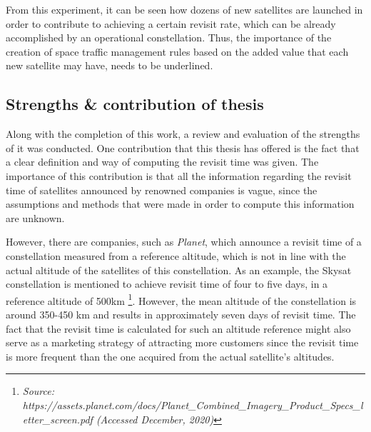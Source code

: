 From this experiment, it can be seen how dozens of new satellites are launched in order to contribute to achieving a certain revisit rate, which can be already accomplished by an operational constellation. Thus, the importance of the creation of space traffic management rules based on the added value that each new satellite may have, needs to be underlined.


%


\bigskip
\subsection{Strengths \& contribution of thesis}
\bigskip

Along with the completion of this work, a review and evaluation of the strengths of it was conducted. One contribution that this thesis has offered is the fact that a clear definition and way of computing the revisit time was given. The importance of this contribution is that all the information regarding the revisit time of satellites announced by renowned companies is vague, since the assumptions and methods that were made in order to compute this information are unknown.

However, there are companies, such as \textit{Planet}, which announce a revisit time of a constellation measured from a reference altitude, which is not in line with the actual altitude of the satellites of this constellation. As an example, the Skysat constellation is mentioned to achieve revisit time of four to five days, in a reference altitude of 500km \footnote{\label{Planet_skysat}\textit{Source: https://assets.planet.com/docs/Planet_Combined_Imagery_Product_Specs_letter_screen.pdf (Accessed December, 2020)}}. However, the mean altitude of the constellation is around 350-450 km and results in approximately seven days of revisit time. The fact that the revisit time is calculated for such an altitude reference might also serve as a marketing strategy of attracting more customers since the revisit time is more frequent than the one acquired from the actual satellite's altitudes. 

